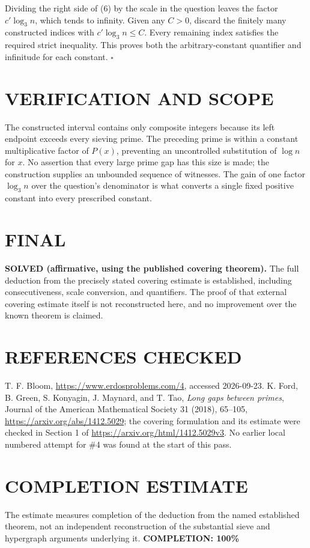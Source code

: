 Dividing the right side of (6) by the scale in the question leaves the factor $c'\log_3n$, which tends to infinity. Given any $C>0$, discard the finitely many constructed indices with $c'\log_3n\le C$. Every remaining index satisfies the required strict inequality. This proves both the arbitrary-constant quantifier and infinitude for each constant. \hfill$\square$

\section{VERIFICATION AND SCOPE}
The constructed interval contains only composite integers because its left endpoint exceeds every sieving prime. The preceding prime is within a constant multiplicative factor of $P(x)$, preventing an uncontrolled substitution of $\log n$ for $x$. No assertion that every large prime gap has this size is made; the construction supplies an unbounded sequence of witnesses. The gain of one factor $\log_3n$ over the question's denominator is what converts a single fixed positive constant into every prescribed constant.

\section{FINAL}
\textbf{SOLVED (affirmative, using the published covering theorem).} The full deduction from the precisely stated covering estimate is established, including consecutiveness, scale conversion, and quantifiers. The proof of that external covering estimate itself is not reconstructed here, and no improvement over the known theorem is claimed.

\section{REFERENCES CHECKED}
T. F. Bloom, \url{https://www.erdosproblems.com/4}, accessed 2026-09-23. K. Ford, B. Green, S. Konyagin, J. Maynard, and T. Tao, \emph{Long gaps between primes}, Journal of the American Mathematical Society 31 (2018), 65--105, \url{https://arxiv.org/abs/1412.5029}; the covering formulation and its estimate were checked in Section 1 of \url{https://arxiv.org/html/1412.5029v3}. No earlier local numbered attempt for \#4 was found at the start of this pass.

\section{COMPLETION ESTIMATE}
The estimate measures completion of the deduction from the named established theorem, not an independent reconstruction of the substantial sieve and hypergraph arguments underlying it.
\textbf{COMPLETION: 100\%}
